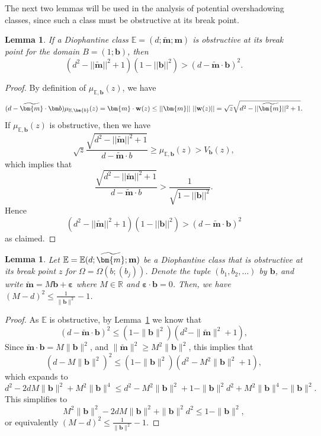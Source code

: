 \documentclass[11pt, reqno]{amsart}
\newtheorem{lemma}[thm]{Lemma}
\theoremstyle{remark}
\numberwithin{equation}{subsection}
\numberwithin{figure}{section}
\theoremstyle{customremark}
\newcommand{\bbm}{{\bf m}}
\newcommand{\bw}{{\bf w}}
\newcommand{\bE}{{\mathbb E}}
\newcommand{\Om}{{\Omega}}
\newcommand{\R}{\mathbb{R}}
\newcommand{\eps}{\varepsilon}
\newcommand{\btm}{\widetilde{\bm{m}}}
\begin{document}
The next two lemmas will be used in the analysis of potential overshadowing classes, since such a 
class must be obstructive at its break point. 


\begin{lemma} \label{lem:nontrivialInequ}
    If a Diophantine class $\bE=(d;\btm;\bm{m})$ is obstructive at its break point for the domain $B=(1;\bm{b})$, then 
     \[ \left(d^2-||\btm||^2+1\right)(1-||\bm{b}||^2) > \left(d- \btm \cdot \bm{b}\right)^2.\]
\end{lemma}
\begin{proof}
       By definition of $\mu_{\bE,\bm{b}}(z)$, we have
    \[ (d-\btm \cdot \bm b) \mu_{\bE,\bm{b}}(z)=\bm{m} \cdot \bw(z) \leq || \bm{m} ||\ || \bw(z) ||=\sqrt{z}\sqrt{d^2-||\btm||^2+1}.\]
    If $\mu_{\bE,\bm{b}}(z)$ is obstructive, then we have \[\sqrt{z}\frac{\sqrt{d^2-||\btm||^2+1}}{d-\btm \cdot b}\geq \mu_{\bE,\bm{b}}(z) > V_{\bm{b}}(z),\] which implies that
    \[\frac{\sqrt{d^2-||\btm||^2+1}}{d-\btm \cdot b}> \frac{1}{\sqrt{1-||\bm{b}||^2}} .\]
    Hence
    \[ \left(d^2-||\btm||^2+1\right)(1-||\bm{b}||^2)> \left(d- \btm \cdot \bm{b}\right)^2\]
    as claimed.
\end{proof}

\begin{lemma} \label{lem:sqrt2} Let $\bE=\bE(d; \btm; \bbm)$ be a Diophantine class that is obstructive at its  break point $z$  for $\Om = \Om(b; (b_j))$. Denote the tuple $(b_1,b_2,\dots)$ by  $\bm{b}$, and write $\btm = M\bm{b} + \bm{\eps}$ where $M\in \R$ and $\bm{\eps}\cdot \bm{b} = 0$. Then, we have $(M-d)^2 \le \frac 1{ \|\bm{b}\|^2} - 1$.
\end{lemma}

\begin{proof} As $\bE$ is obstructive, by Lemma~\ref{lem:nontrivialInequ} we know that 
$$
(d-\btm \cdot\bm{b})^2 \le (1-\|\bm{b} \|^2) (d^2 - \|\btm\|^2 + 1),
$$
Since $\btm\cdot\bm{b}= M\|\bm{b}\|^2$,  
 and $ \|\btm\|^2\ge M^2\|\bm{b}\|^2$, this implies that
$$
(d- M\|\bm{b}\|^2)^2 \le (1-\|\bm{b}\|^2) (d^2 - M^2\|\bm{b}\|^2 + 1),
$$
which expands to
$$
d^2 - 2dM \|\bm{b}\|^2 + M^2 \|\bm{b}\|^4  \le d^2 - M^2\|\bm{b}\|^2 + 1  -\|\bm{b}\|^2 d^2 + M^2\|\bm{b}\|^4 - \|\bm{b}\|^2.
 $$
This simplifies to
$$
 M^2\|\bm{b}\|^2   - 2dM \|\bm{b}\|^2 + \|\bm{b}\|^2 d^2 \le 1 -  \|\bm{b}\|^2,
 $$
 or equivalently 
 $
 (M-d)^2 \le \frac 1{ \|\bm{b}\|^2} - 1.
 $
\end{proof} 
\end{document}
